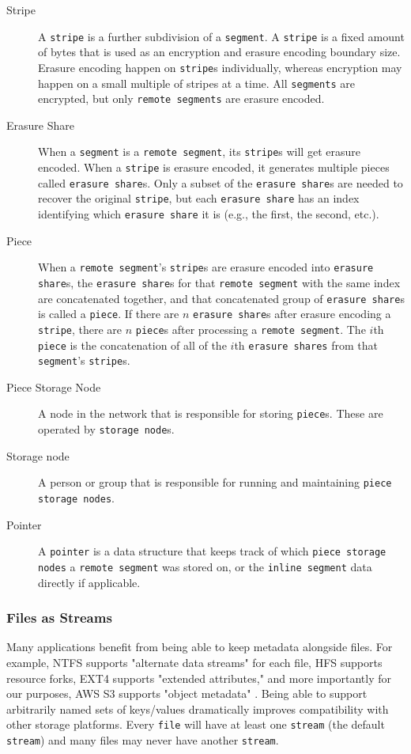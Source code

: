\documentclass[a4paper,10pt]{article} \usepackage[utf8]{inputenc}
\newcommand{\x}[1]{{\tt #1}} \newcommand{\code}[1]{{\tt #1}}
\begin{document}
\begin{description}
\item[Stripe] A \x{stripe} is a further subdivision of a \x{segment}. A
\x{stripe} is a fixed amount of bytes that is used as an encryption and erasure
encoding boundary size. Erasure encoding happen on \x{stripe}s individually,
whereas encryption may happen on a small multiple of stripes at a time. All
\x{segments} are encrypted, but only \x{remote segments} are erasure encoded.

\item[Erasure Share] When a \x{segment} is a \x{remote segment}, its \x{stripe}s
will get erasure encoded. When a \x{stripe} is erasure encoded, it generates
multiple pieces called \x{erasure share}s. Only a subset of the \x{erasure
share}s are needed to recover the original \x{stripe}, but each \x{erasure
share} has an index identifying which \x{erasure share} it is (e.g., the first,
the second, etc.).

\item[Piece] When a \x{remote segment}'s \x{stripe}s are erasure encoded into
\x{erasure share}s, the \x{erasure share}s for that \x{remote segment} with the
same index are concatenated together, and that concatenated group of \x{erasure
share}s is called a \x{piece}. If there are $n$ \x{erasure share}s after erasure
encoding a \x{stripe}, there are $n$ \x{piece}s after processing a \x{remote
segment}. The $i$th \x{piece} is the concatenation of all of the $i$th
\x{erasure shares} from that \x{segment}'s \x{stripe}s.

\item[Piece Storage Node] A node in the network that is responsible for storing
\x{piece}s. These are operated by \x{storage node}s.

\item[Storage node] A person or group that is responsible for running and 
maintaining
\x{piece storage nodes}.

\item[Pointer] A \x{pointer} is a data structure that keeps track of which
\x{piece storage nodes} a \x{remote segment} was stored on, or the \x{inline
segment} data directly if applicable.

\end{description}

\subsubsection{Files as Streams}

Many applications benefit from being able to keep metadata alongside files. For
example, NTFS supports "alternate data streams" for each file, HFS supports
resource forks, EXT4 supports "extended attributes," and more importantly for
our purposes, AWS S3 supports "object metadata" \cite{s3-object-meta}. Being
able to support arbitrarily named sets of keys/values dramatically improves
compatibility with other storage platforms. Every \x{file} will have at least
one
\x{stream} (the default \x{stream}) and many files may never have another
\x{stream}.
\end{document}
